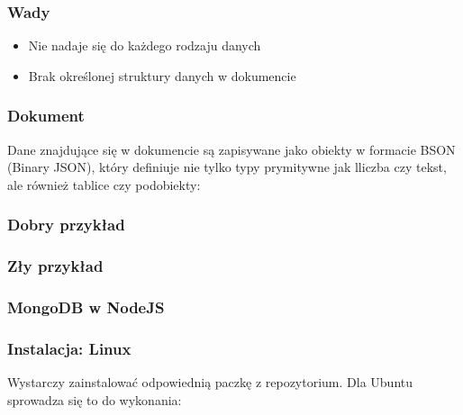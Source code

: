 \documentclass{beamer}
\begin{document}
  \begin{frame}
    \frametitle{Wady}
    \begin{itemize}
      \item Nie nadaje się do każdego rodzaju danych
      \item Brak określonej struktury danych w dokumencie
    \end{itemize}
  \end{frame}

  \begin{frame}
    \frametitle{Dokument}
    Dane znajdujące się w dokumencie są zapisywane jako obiekty w formacie BSON (Binary JSON), który definiuje nie tylko typy prymitywne jak lliczba czy tekst, ale również tablice czy podobiekty:
    
  \end{frame}

  \begin{frame}
    \frametitle{Dobry przykład}
  \end{frame}

  \begin{frame}
    \frametitle{Zły przykład}
  \end{frame}

  \begin{frame}
    \frametitle{MongoDB w NodeJS}
  \end{frame}

  \begin{frame}
    \frametitle{Instalacja: Linux}
    Wystarczy zainstalować odpowiednią paczkę z repozytorium. Dla Ubuntu sprowadza się to do wykonania:

    
  \end{frame}
\end{document}
